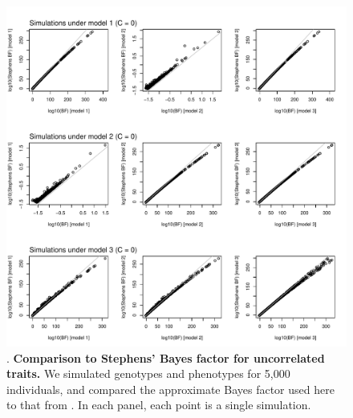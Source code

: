 \documentclass[11pt,titlepage]{article}
\begin{document}
 
\begin{figure}
\begin{center}
\includegraphics[scale = 0.6]{figs/allc0.pdf}
\caption{. \textbf{Comparison to Stephens' Bayes factor for uncorrelated traits.} We simulated genotypes and phenotypes for 5,000 individuals, and compared the approximate Bayes factor used here to that from \citet{Stephens:2013fk}. In each panel, each point is a single simulation. }\label{f_c0}
\end{center}
\end{figure}
\end{document}
